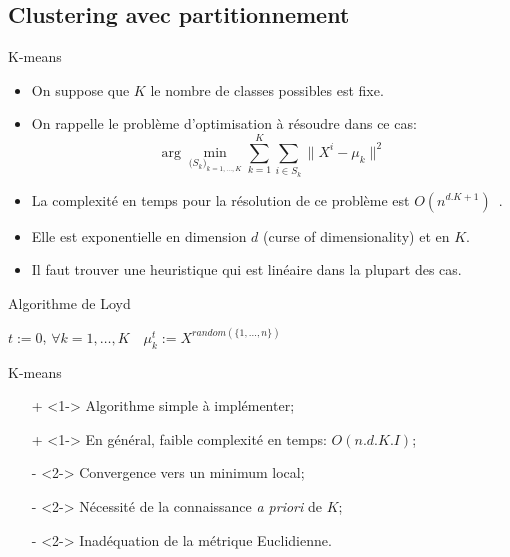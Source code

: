 \documentclass[8pt]{beamer}
\begin{document}
		\subsection{Clustering avec partitionnement}
			\begin{frame}{K-means}
				\begin{itemize}
					\item<1-> On suppose que \(K\) le nombre de classes possibles est fixe.
					\item<2-> On rappelle le problème d'optimisation à résoudre dans ce cas:
						\begin{equation}
							\arg \min_{\big(S_k\big)_{k = 1, \dots, K}} \sum_{k= 1}^{K} \sum_{i\in S_k} \lVert X^i - \mu_k\rVert^2
						\end{equation}
					\item<3-> La complexité en temps pour la résolution de ce problème est \(O(n^{d.K+1})\)~\cite{inaba1994applications}.
					\item<4-> Elle est exponentielle en dimension \(d\) (curse of dimensionality) et en \(K\).
					\item<5-> Il faut trouver une heuristique qui est linéaire dans la plupart des cas.
				\end{itemize}
			\end{frame}
			\begin{frame}{Algorithme de Loyd}
				\begin{algorithm}[H]

					\(t := 0\), \(\forall k = 1,\dots,K \quad \mu^t_k := X^{random(\{1,\dots,n\})}\)\;
				\end{algorithm}
			\end{frame}
			\begin{frame}{K-means}
				\begin{itemize}
					\item[\color{green}+]<1-> Algorithme simple à implémenter;
					\item[\color{green}+]<1-> En général, faible complexité en temps: \(O(n.d.K.I)\);
					\item[\color{red}-]<2-> Convergence vers un minimum local;
					\item[\color{red}-]<2-> Nécessité de la connaissance \textit{a priori} de \(K\);
					\item[\color{red}-]<2-> Inadéquation de la métrique Euclidienne.
				\end{itemize}
			\end{frame}
\end{document}
